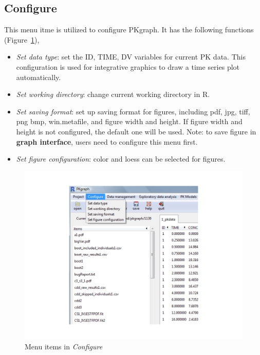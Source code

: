 \documentclass[a4paper]{article}
\begin{document}
\subsection{Configure}
This menu itme is utilized to configure PKgraph. It has the following functions (Figure~\ref{configure}),
\begin{itemize}
	\item \textit{Set data type}: set the ID, TIME, DV variables for current PK data. This configuration is used for integrative graphics to draw a time series plot automatically.
	\item \textit{Set working directory}: change current working directory in R.
	\item \textit{Set saving format}: set up saving format for figures, including pdf, jpg, tiff, png
  bmp, win.metafile, and figure width and height. If figure width and height is not 
  configured, the default one will be used. 
  Note: to save figure in \textbf{graph interface}, users need to configure this menu 
  first. 
  \item \textit{Set figure configuration}: color and loess can be selected for figures.
\end{itemize}
\begin{figure}[h!tb] \centering
\includegraphics[scale=0.6]{configure.pdf}
\caption{Menu items in \textit{Configure}}
\label{configure}
\end{figure}
\end{document}
